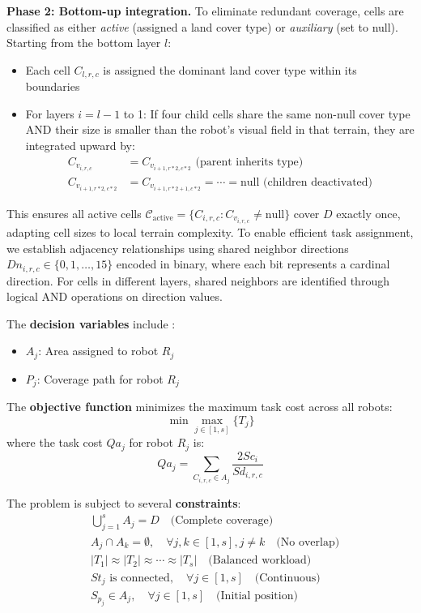 \textbf{Phase 2: Bottom-up integration.} To eliminate redundant coverage, cells are classified as either \textit{active} (assigned a land cover type) or \textit{auxiliary} (set to null). Starting from the bottom layer $l$:
\begin{itemize}
    \item Each cell $C_{l,r,c}$ is assigned the dominant land cover type within its boundaries
    \item For layers $i = l-1$ to 1: If four child cells share the same non-null cover type AND their size is smaller than the robot's visual field in that terrain, they are integrated upward by:
    \begin{align}
        C_{v_{i,r,c}} &= C_{v_{i+1,r*2,c*2}} \text{ (parent inherits type)}\\
        C_{v_{i+1,r*2,c*2}} &= C_{v_{i+1,r*2+1,c*2}} = \cdots = \text{null} \text{ (children deactivated)}
    \end{align}
\end{itemize}
This ensures all active cells $\mathcal{C}_{\text{active}} = \{C_{i,r,c} : C_{v_{i,r,c}} \neq \text{null}\}$ cover $D$ exactly once, adapting cell sizes to local terrain complexity.
To enable efficient task assignment, we establish adjacency relationships using shared neighbor directions $Dn_{i,r,c} \in \{0,1,\ldots,15\}$ encoded in binary, where each bit represents a cardinal direction. For cells in different layers, shared neighbors are identified through logical AND operations on direction values.

The \textbf{decision variables} include :
\begin{itemize}
    \item $A_j$: Area assigned to robot $R_j$
    \item $P_j$: Coverage path for robot $R_j$
\end{itemize}

The \textbf{objective function} minimizes the maximum task cost across all robots:
\begin{equation}
    \min \max_{j \in [1,s]}\{T_j\}
\end{equation}
where the task cost $Qa_j$ for robot $R_j$ is:
\begin{equation}
    Qa_j = \sum_{C_{i,r,c} \in A_j} \frac{2Sc_i}{Sd_{i,r,c}}
\end{equation}

The problem is subject to several \textbf{constraints}:
\begin{align}
    &\bigcup_{j=1}^{s} A_j = D \quad \text{(Complete coverage)}\\
    &A_j \cap A_k = \emptyset, \quad \forall j,k \in [1,s], j \neq k \quad \text{(No overlap)}\\
    &|T_1| \approx |T_2| \approx \cdots \approx |T_s| \quad \text{(Balanced workload)}\\
    &St_j \text{ is connected}, \quad \forall j \in [1,s] \quad \text{(Continuous)}\\
    &S_{p_j} \in A_j, \quad \forall j \in [1,s] \quad \text{(Initial position)}
\end{align}